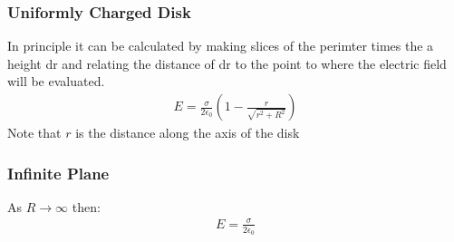 \documentclass[12pt,twocolumn]{article}
\begin{document}
\subsubsection*{Uniformly Charged Disk}
In principle it can be calculated by making slices of the perimter times the a
height dr and relating the distance of dr to the point to where the electric
field will be evaluated.
\begin{align*}
  E = \frac{\sigma}{2\epsilon_0} \left( 1 - \frac{r}{ \sqrt{r^2+R^2} } \right)
\end{align*}
Note that $r$ is the distance along the axis of the disk

\subsubsection*{Infinite Plane}
As $R \rightarrow \infty$ then:
\begin{align*}
E = \frac{\sigma}{2\epsilon_0}
\end{align*}
\end{document}
